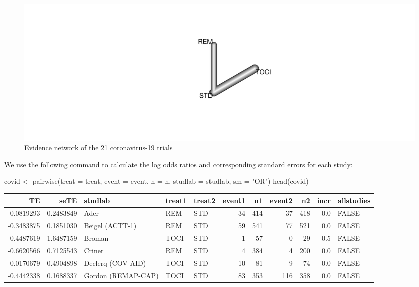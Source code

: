\documentclass[
  letterpaper,
  DIV=11,
  numbers=noendperiod]{scrreprt}
\newenvironment{Shaded}{\begin{snugshade}}{\end{snugshade}}
\newcommand{\AttributeTok}[1]{\textcolor[rgb]{0.40,0.45,0.13}{#1}}
\newcommand{\FunctionTok}[1]{\textcolor[rgb]{0.28,0.35,0.67}{#1}}
\newcommand{\NormalTok}[1]{\textcolor[rgb]{0.00,0.23,0.31}{#1}}
\newcommand{\OtherTok}[1]{\textcolor[rgb]{0.00,0.23,0.31}{#1}}
\newcommand{\StringTok}[1]{\textcolor[rgb]{0.13,0.47,0.30}{#1}}
\begin{document}
\begin{figure}

{\centering \includegraphics{chapter_10_files/figure-pdf/unnamed-chunk-9-1.pdf}

}

\caption{Evidence network of the 21 coronavirus-19 trials}

\end{figure}

We use the following command to calculate the log odds ratios and
corresponding standard errors for each study:

\begin{Shaded}
\begin{Highlighting}[]
\NormalTok{covid }\OtherTok{\textless{}{-}} \FunctionTok{pairwise}\NormalTok{(}\AttributeTok{treat =}\NormalTok{ treat, }\AttributeTok{event =}\NormalTok{ event, }\AttributeTok{n =}\NormalTok{ n, }\AttributeTok{studlab =}\NormalTok{ studlab, }\AttributeTok{sm =} \StringTok{"OR"}\NormalTok{)}
\FunctionTok{head}\NormalTok{(covid)}
\end{Highlighting}
\end{Shaded}

\begin{tabular}{r|r|l|l|l|r|r|r|r|r|l}
\hline
TE & seTE & studlab & treat1 & treat2 & event1 & n1 & event2 & n2 & incr & allstudies\\
\hline
-0.0819293 & 0.2483849 & Ader & REM & STD & 34 & 414 & 37 & 418 & 0.0 & FALSE\\
\hline
-0.3483875 & 0.1851030 & Beigel (ACTT-1) & REM & STD & 59 & 541 & 77 & 521 & 0.0 & FALSE\\
\hline
0.4487619 & 1.6487159 & Broman & TOCI & STD & 1 & 57 & 0 & 29 & 0.5 & FALSE\\
\hline
-0.6620566 & 0.7125543 & Criner & REM & STD & 4 & 384 & 4 & 200 & 0.0 & FALSE\\
\hline
0.0170679 & 0.4904898 & Declerq (COV-AID) & TOCI & STD & 10 & 81 & 9 & 74 & 0.0 & FALSE\\
\hline
-0.4442338 & 0.1688337 & Gordon (REMAP-CAP) & TOCI & STD & 83 & 353 & 116 & 358 & 0.0 & FALSE\\
\hline
\end{tabular}
\end{document}
